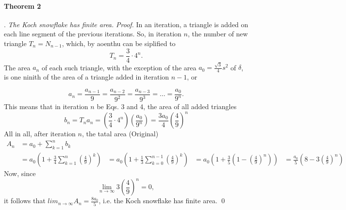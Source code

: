 \documentclass{article}
\begin{document}
\paragraph{Theorem 2}. \emph{The Koch snowflake has finite area.}
\emph{Proof.} In an iteration, a triangle is added on each line segment of the
previous iterations. So, in iteration $n$, the number of new triangle
$T_n = N_{n-1}$, which, by aoenthu can be siplified to
\begin{equation}
	T_n = \frac 3 4 \cdot 4^n.
\end{equation}
The area $a_n$ of each such triangle, with the exception of the area
$a_0 = \frac {\sqrt 3} 4 s^2$ of $\delta$, is one ninith of the area of a 
triangle added in iteration $n - 1$, or

\begin{equation}
	a_n = \frac {a_{n-1}} {9}
		= \frac {a_{n-2}} {9^2}
		= \frac {a_{n-3}} {9^3}
		= \ldots
		= \frac {a_0} {9^n}.
\end{equation}
This means that in iteration $n$ be Eqs. 3 and 4, the area of all added
triangles
$$
	b_n = T_na_n = \left (
		\frac 3 4 \cdot 4^n
	\right )
	\left (
		\frac {a_0} {9^n}
	\right ) = \frac {3a_0} 4 \left (
	\frac 4 9
	\right )^n
$$
All in all, after iteration $n$, the tatal area \hfill (Original)
\newcommand{\ubersum}[2] {
	\sum_{k=#2}^{n#1}
}
\begin{align*}
	A_n &= a_0 + \ubersum{}{1} b_k \\
		&= a_0 \left (
				1 + \frac 3 4 \ubersum{}{1}\left(\frac 4 9 \right )^k
			\right )
		&= a_0 \left (
				1 + \frac 1 3 \ubersum{-1}{0}\left(\frac 4 9 \right )^k
			\right )
		&= a_0 \left (
				1 + \frac 3 5 \left ( 1 - \left( \frac 4 9 \right )^n \right )
			\right )
		&= \frac {a_0} 5 \left (
				8 - 3 \left ( \frac 4 9 \right )^n
			\right )
\end{align*}
Now, since
$$
	\lim_{n \to \infty} 3 \left ( \frac 4 9 \right )^n = 0,
$$
it follows that $lim_{n \to \infty} A_n = \frac {8a_0} 5$, i.e. the Koch 
snowflake has finite area. \hfill \qed
\end{document}
